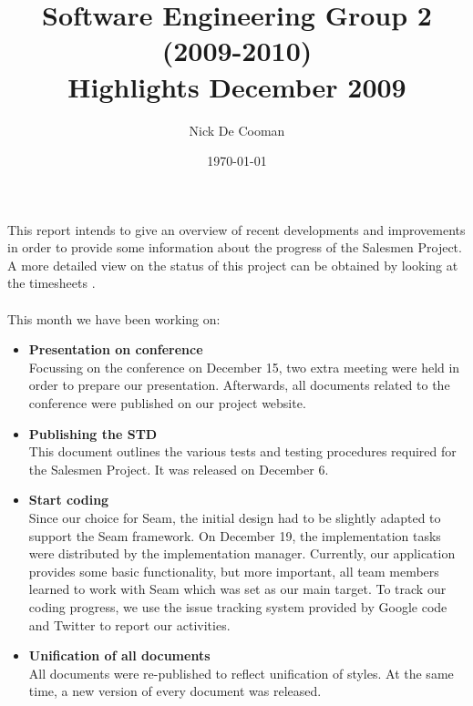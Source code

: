 \documentclass{article}
\begin{document}
	\title{Software Engineering Group 2 (2009-2010) \\ Highlights December 2009}
	\author{Nick De Cooman}
	\date {\today}

\maketitle

This report intends to give an overview of recent developments and improvements in order to provide some information about the progress of the Salesmen Project. A more detailed view on the status of this project can be obtained by looking at the timesheets \cite{timesheets}. \\
\\
This month we have been working on:

\begin{itemize}
	
	
	\item \textbf{Presentation on conference} \\
Focussing on the conference on December 15, two extra meeting were held in order to prepare our presentation. Afterwards, all documents \cite{conference} related to the conference were published on our project website. 
	
	\item \textbf{Publishing the STD} \\
	This document \cite{std} outlines the various tests and testing procedures required for the Salesmen Project. It was released on December 6.
	
	\item \textbf{Start coding} \\
	Since our choice for Seam, the initial design had to be slightly adapted to support the Seam framework. On December 19, the implementation tasks were distributed \cite{tasks} by the implementation manager. Currently, our application provides some basic functionality, but more important, all team members learned to work with Seam which was set as our main target. To track our coding progress, we use the issue tracking system \cite{issues} provided by Google code and Twitter \cite{twitter}  to report our activities. 
	
	
	\item \textbf{Unification of all documents} \\
All documents were re-published to reflect unification of styles. At the same time, a new version of every document was released.
\end{itemize}
  
\end{document}
